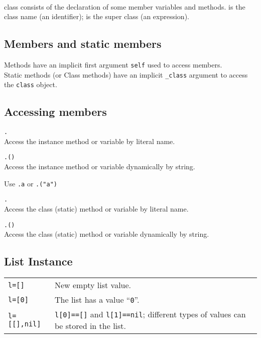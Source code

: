 \hangpar {} \\
class consists of the declaration of some member variables and methods.  is the class name (an identifier);  is the super class (an expression).

\subsection*{Members and static members}

Methods have an implicit first argument \texttt{self} used to access members.\\
Static methods (or Class methods) have an implicit \texttt{\_class} argument to access the \texttt{class} object.

\subsection*{Accessing members}

\hangpar {}\texttt{.}\\
Access the instance method or variable by literal name.

\hangpar {}\texttt{.(}\texttt{)}\\
Access the instance method or variable dynamically by string.

Use \texttt{.a} or \texttt{.("a")}

\hangpar {}\texttt{.}\\
Access the class (static) method or variable by literal name.

\hangpar {}\texttt{.(}\texttt{)}\\
Access the class (static) method or variable dynamically by string.


\subsection*{List Instance}
\begin{tabular}{@{}lp{}}
\texttt{l=[]} & New empty list value. \\
\texttt{l=[0]} & The list has a value ``\texttt{0}''. \\
\texttt{l=[[],nil]} & \texttt{l[0]==[]} and \texttt{l[1]==nil}; different types of values can be stored in the list. \\
\end{tabular}

